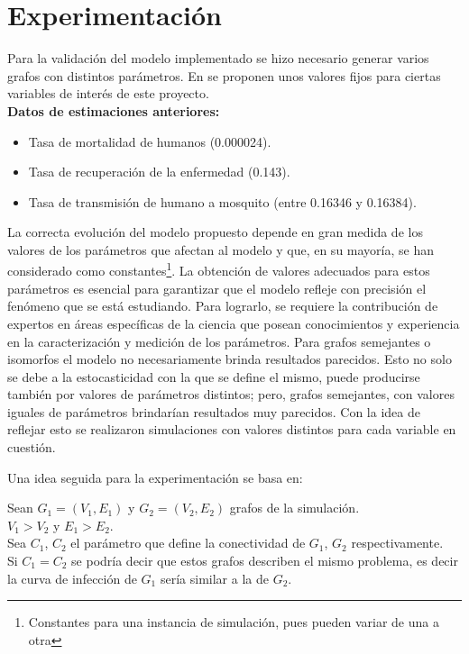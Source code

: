 \section{Experimentación}
Para la validación del modelo implementado se hizo necesario generar varios grafos con distintos parámetros.
En \autocite{Arazoza2010} se proponen unos valores fijos para ciertas variables de interés de este proyecto.\\

\textbf{Datos de estimaciones anteriores:}\autocite{Arazoza2010}
\begin{itemize}
    \item Tasa de mortalidad de humanos (0.000024).
    \item Tasa de recuperación de la enfermedad (0.143).
    \item Tasa de transmisión de humano a mosquito (entre 0.16346 y 0.16384).
\end{itemize}

La correcta evolución del modelo propuesto depende en gran medida de los valores de los parámetros que 
afectan al modelo y que, en su mayoría, se han considerado como constantes\footnote{Constantes para una 
instancia de simulación, pues pueden variar de una a otra}. La obtención de valores 
adecuados para estos parámetros es esencial para garantizar que el modelo refleje con precisión el 
fenómeno que se está estudiando. Para lograrlo, se requiere la contribución de expertos en áreas específicas 
de la ciencia que posean conocimientos y experiencia en la caracterización y medición de los parámetros.
Para grafos semejantes o isomorfos el modelo no necesariamente brinda resultados parecidos. Esto no solo 
se debe a la estocasticidad con la que se define el mismo, puede producirse también por valores de 
parámetros distintos; pero, grafos semejantes, con valores iguales de parámetros brindarían 
resultados muy parecidos. Con la idea de reflejar esto se realizaron simulaciones con valores distintos
para cada variable en cuestión.

Una idea seguida para la experimentación se basa en:
\begin{center}
    Sean $G_1=(V_1, E_1)$ y $G_2=(V_2, E_2)$ grafos de la simulación.\\
    $V_1 > V_2$ y $E_1 > E_2$.\\
    Sea $C_1$, $C_2$ el parámetro que define la conectividad de $G_1$, $G_2$ respectivamente.\\
    Si $C_1 = C_2$ se podría decir que estos grafos describen el mismo problema, es decir
    la curva de infección de $G_1$ sería similar a la de $G_2$.
\end{center} 

